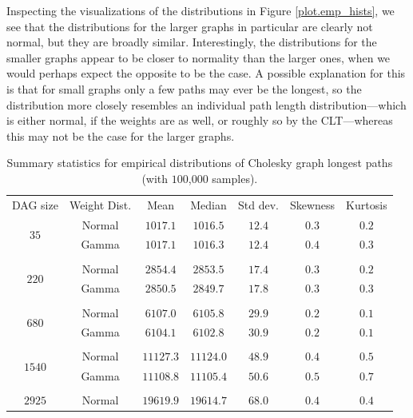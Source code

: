 \documentclass[12pt]{article}
\begin{document}
Inspecting the visualizations of the distributions in Figure \ref{plot.emp_hists}, we see that the distributions for the larger graphs in particular are clearly not normal, but they are broadly similar. Interestingly, the distributions for the smaller graphs appear to be closer to normality than the larger ones, when we would perhaps expect the opposite to be the case. A possible explanation for this is that for small graphs only a few paths may ever be the longest, so the distribution more closely resembles an individual path length distribution---which is either normal, if the weights are as well, or roughly so by the CLT---whereas this may not be the case for the larger graphs.  

 \begin{table}
	\caption{Summary statistics for empirical distributions of Cholesky graph longest paths (with $100$,$000$ samples).} 
	\begin{center}	
		\begin{tabular}{c c c c c c c}
                  \toprule
                  DAG size & Weight Dist. & Mean & Median & Std dev. & Skewness & Kurtosis \\
                  \cmidrule{1-7}
                  \multirow{2}{*}{$35$} & Normal & $1017.1$ & $1016.5$ & $12.4$ & $0.3$ & $0.2$\\
                           & Gamma & $1017.1$ & $1016.3$ & $12.4$ & $0.4$ & $0.3$\\
                  \\
                  \multirow{2}{*}{$220$} & Normal & $2854.4$ & $2853.5$ & $17.4$ & $0.3$ & $0.2$\\
                           & Gamma & $2850.5$ & $2849.7$ & $17.8$ & $0.3$ & $0.3$\\
                  \\
                  \multirow{2}{*}{$680$} & Normal & $6107.0$ & $6105.8$ & $29.9$ & $0.2$ & $0.1$\\
                           & Gamma & $6104.1$ & $6102.8$ & $30.9$ & $0.2$ & $0.1$\\
                  \\
                  \multirow{2}{*}{$1540$} & Normal & $11127.3$ & $11124.0$ & $48.9$ & $0.4$ & $0.5$\\
                           & Gamma & $11108.8$ & $11105.4$ & $50.6$ & $0.5$ & $0.7$\\
                  \\
                  \multirow{2}{*}{$2925$} & Normal & $19619.9$ & $19614.7$ & $68.0$ & $0.4$ & $0.4$\\

\end{tabular}
\end{center}
\end{table}
\end{document}
